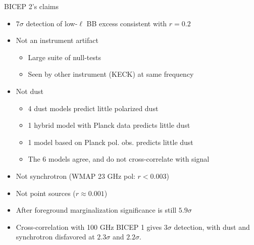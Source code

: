 \documentclass{beamer}
\begin{document}
\begin{frame}{BICEP 2's claims}
	\begin{itemize}
		\item<2-> $7\sigma$ detection of low-$\ell$ BB excess consistent with $r=0.2$
		\item<3-> Not an instrument artifact
			\begin{itemize}
				\item<4-> Large suite of null-tests
				\item<5-> Seen by other instrument (KECK) at same frequency
			\end{itemize}
		\item<6-> Not dust
			\begin{itemize}
				\item<7-> 4 dust models predict little polarized dust
				\item<8-> 1 hybrid model with Planck data predicts little dust
				\item<9-> 1 model based on Planck pol. obs. predicts little dust
				\item<10-> The 6 models agree, and do not cross-correlate with signal
			\end{itemize}
		\item<11-> Not synchrotron (WMAP 23 GHz pol: $r<0.003$)
		\item<12-> Not point sources ($r\approx0.001$)
		\item<13-> After foreground marginalization significance is still $5.9\sigma$
		\item<14-> Cross-correlation with 100 GHz BICEP 1 gives $3\sigma$ detection,
			with dust and synchrotron disfavored at $2.3\sigma$ and $2.2\sigma$.
	\end{itemize}
\end{frame}
%
\end{document}
